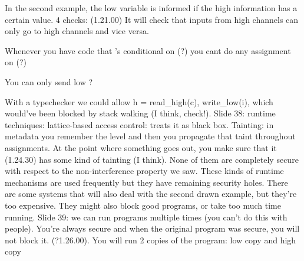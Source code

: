 \documentclass[10pt,a4paper]{report}
\begin{document}
	
	
	
	
	
	
	
	In the second example, the low variable is informed if the high information has a certain value.
	4 checks: (1.21.00)
	It will check that inputs from high channels can only go to high channels and vice versa.
	
	Whenever you have code that 's conditional on (?) you cant do any assignment on (?) 
	
	You can only send low ?
	
	With a typechecker we could allow h = read\_high(c), write\_low(i), which would've been blocked by stack walking (I think, check!).
Slide 38: runtime techniques: lattice-based access control: treats it as black box.
Tainting: in metadata you remember the level and then you propagate that taint throughout assignments. At the point where something goes out, you make sure that it (1.24.30) has some kind of tainting (I think). 
None of them are completely secure with respect to the non-interference property we saw. 
These kinds of runtime mechanisms are used frequently but they have remaining security holes. 
There are some systems that will also deal with the second drawn example, but they're too expensive. They might also block good programs, or take too much time running.
Slide 39: we can run programs multiple times (you can't do this with people). You're always secure and when the original program was secure, you will not block it. (?1.26.00).
You will run 2 copies of the program: low copy and high copy





\end{document}
